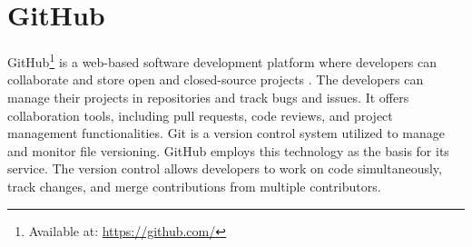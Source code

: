 \section{GitHub}
GitHub\footnote{Available at: \url{https://github.com/}} is a web-based software development platform where developers can collaborate and store open and closed-source projects \cite{github}. The developers can manage their projects in repositories and track bugs and issues. It offers collaboration tools, including pull requests, code reviews, and project management functionalities. Git is a version control system utilized to manage and monitor file versioning. GitHub employs this technology as the basis for its service. The version control allows developers to work on code simultaneously, track changes, and merge contributions from multiple contributors.

